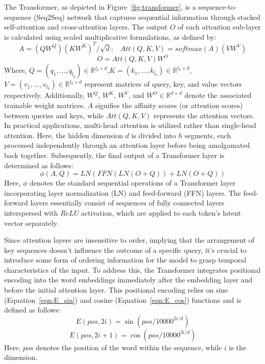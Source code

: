 The Transformer, as depicted in Figure~\ref{fig:transformer}, is a sequence-to-sequence (Seq2Seq) network that captures sequential information through stacked self-attention and cross-attention layers. 
The output $O$ of each attention sub-layer is calculated using scaled multiplicative formulations, as defined by:
\begin{equation}
	A = (QW^Q)(KW^K)^T/\sqrt{d};\;\;\;   
	Att(Q, K, V ) = softmax(A)(V W^V )
\end{equation}
\begin{equation}
	O = Att(Q, K, V )W^O
\end{equation}
Where, $Q = (q_1, ..., q_{l_q}) \in \mathbb{R}^{l_q \times d}$,$K = (k_1, ..., k_{l_k}) \in \mathbb{R}^{l_k \times d}$, $V = (v_1, ..., v_{l_k}) \in \mathbb{R}^{l_k \times d}$ represent matrices of query, key, and value vectors respectively. Additionally, $W^Q$, $W^K$, $W^V$, and $W^O \in \mathbb{R}^{d \times d}$ denote the associated trainable weight matrices. $A$ signifies the affinity scores (or attention scores) between queries and keys, while $Att(Q, K, V)$ represents the attention vectors.
In practical applications, multi-head attention is utilized rather than single-head attention. 
Here, the hidden dimension $d$ is divided into $h$ segments, each processed independently through an attention layer before being amalgamated back together. 
Subsequently, the final output of a Transformer layer is determined as follows:
\begin{equation}
	\phi(A, Q) = LN(FFN(LN(O + Q)) + LN(O + Q))
\end{equation}
Here, $\phi$ denotes the standard sequential operations of a Transformer layer incorporating layer normalization (LN) and feed-forward (FFN) layers. The feed-forward layers essentially consist of sequences of fully connected layers interspersed with $ReLU$ activation, which are applied to each token's latent vector separately.

Since attention layers are insensitive to order, implying that the arrangement of key sequences doesn't influence the outcome of a specific query, it's crucial to introduce some form of ordering information for the model to grasp temporal characteristics of the input. 
To address this, the Transformer integrates positional encoding into the word embeddings immediately after the embedding layer and before the initial attention layer. 
This positional encoding relies on sine (Equation~\ref{eqn:E_sin}) and cosine (Equation~\ref{eqn:E_cos}) functions and is defined as follows:
\begin{equation}
	E(pos, 2i) = \sin(pos/10000^{2i/d})
	\label{eqn:E_sin}
\end{equation}
\begin{equation}
	E(pos, 2i+1) = \cos(pos/10000^{2i/d})
	\label{eqn:E_cos}
\end{equation}
Here, $pos$ denotes the position of the word within the sequence, while $i$ is the dimension.

